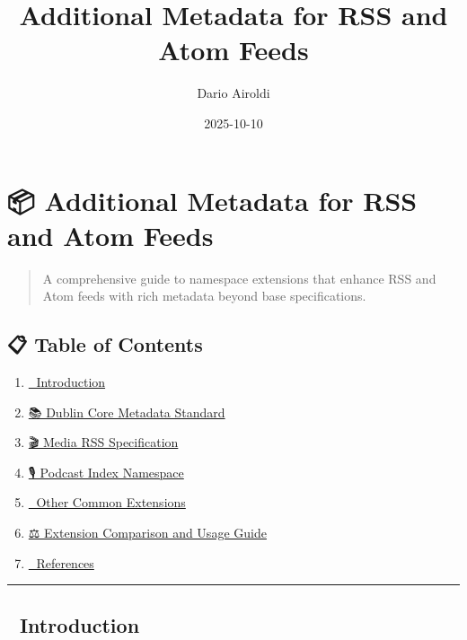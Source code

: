 \documentclass[
  letterpaper,
  DIV=11,
  numbers=noendperiod]{scrartcl}
\title{Additional Metadata for RSS and Atom Feeds}
\author{Dario Airoldi}
\date{2025-10-10}
\providecommand{\tightlist}{%
  \setlength{\itemsep}{0pt}\setlength{\parskip}{0pt}}\usepackage{longtable,booktabs,array}
\renewcommand*\contentsname{Table of contents}
\newcommand\contentsname{Table of contents}
\begin{document}
\maketitle

\renewcommand*\contentsname{Table of contents}
{
\hypersetup{linkcolor=}
\setcounter{tocdepth}{3}
\tableofcontents
}

\section{📦 Additional Metadata for RSS and Atom
Feeds}\label{additional-metadata-for-rss-and-atom-feeds}

\begin{quote}
A comprehensive guide to namespace extensions that enhance RSS and Atom
feeds with rich metadata beyond base specifications.
\end{quote}

\subsection{📋 Table of Contents}\label{table-of-contents}

\begin{enumerate}
\def\labelenumi{\arabic{enumi}.}
\tightlist
\item
  \hyperref[-introduction]{🎯 Introduction}
\item
  \hyperref[-dublin-core-metadata-standard]{📚 Dublin Core Metadata
  Standard}
\item
  \hyperref[-media-rss-specification]{🎬 Media RSS Specification}
\item
  \hyperref[uxfe0f-podcast-index-namespace]{🎙️ Podcast Index Namespace}
\item
  \hyperref[-other-common-extensions]{🔌 Other Common Extensions}
\item
  \hyperref[uxfe0f-extension-comparison-and-usage-guide]{⚖️ Extension
  Comparison and Usage Guide}
\item
  \hyperref[-references]{📖 References}
\end{enumerate}

\begin{center}\rule{0.5\linewidth}{0.5pt}\end{center}

\subsection{🎯 Introduction}\label{introduction}
\end{document}
